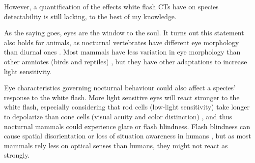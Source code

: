 
However, a quantification of the effects white flash CTs have on species detectability is still lacking, to the best of my knowledge.



As the saying goes, eyes are the window to the soul.
It turns out this statement also holds for animals, as nocturnal vertebrates have different eye morphology than diurnal ones \autocite{Schmitz2010}. Most mammals have less variation in eye morphology than other amniotes (birds and reptiles) \autocite{Schmitz2010, Hall2012}, but they have other adaptations to increase light sensitivity\autocite{Ollivier2004,Solovei2009}. 

Eye characteristics governing nocturnal behaviour could also affect a species' response to the white flash. More light sensitive eyes will react stronger to the white flash, especially considering that rod cells (low-light sensitivity) take longer to depolarize than cone cells (visual acuity and color distinction) \autocite{Dryja2005}, and thus nocturnal mammals could experience glare or flash blindness.
Flash blindness can cause spatial disorientation or loss of situation awareness in humans \autocite{Nakagawara2001}, but as most mammals rely less on optical senses than humans, they might not react as strongly.

%
%


